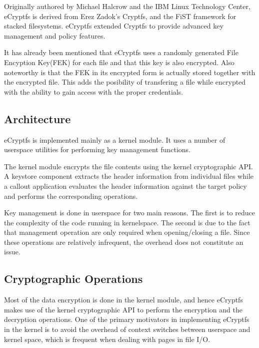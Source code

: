 Originally authored by Michael Halcrow and the IBM Linux Technology Center, eCryptfs is derived from Erez Zadok's Cryptfs, and the FiST framework for stacked filesystems. eCryptfs extended Cryptfs to provide advanced key management and policy features\cite{ecryptfs-paper}.

It has already been mentioned that eCryptfs uses a randomly generated File Encyption Key(FEK) for each file and that this key is also encrypted. Also noteworthy is that the FEK in its encrypted form is actually stored together with the encrypted file. This adds the posibility of transfering a file while encrypted with the ability to gain access with the proper credentials.

\subsection{Architecture}
\label{sub-sec:arch-ecryptfs}

eCryptfs is implemented mainly as a kernel module. It uses a number of userspace utilities for performing key management functions.


The kernel module encrypts the file contents using the kernel cryptographic API. A keystore component extracts the header information from individual files while a callout application evaluates the header information against the target policy and performs the corresponding operations.

Key management is done in userspace for two main reasons. The first is to reduce the complexity of the code running in kernelspace. The second is due to the fact that management operation are only required when opening/closing a file. Since these operations are relatively infrequent, the overhead does not constitute an issue.

\subsection{Cryptographic Operations}
\label{sub-sec:crypt-ops-ecryptfs}

Most of the data encryption is done in the kernel module, and hence eCryptfs makes use of the kernel cryptographic API to perform the encryption and the decryption operations. One of the primary motivators in implementing eCryptfs in the kernel is to avoid the overhead of context switches between userspace and kernel space, which is frequent when dealing with pages in file I/O.

